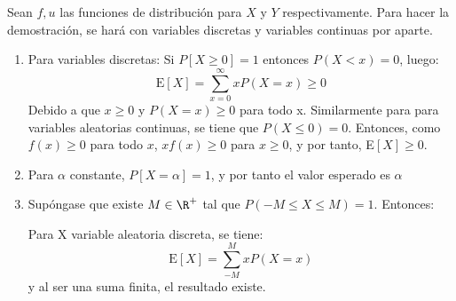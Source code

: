 \begin{Demo} Sean $f,u$ las funciones de distribución para $X$ y $Y$
    respectivamente. Para hacer la demostración, se hará con variables discretas 
    y variables continuas por aparte.

\begin{enumerate}
    \item Para variables discretas:
    Si $P[X \geq 0]=1$ entonces $P(X < x)=0$, luego:
    \[
        \text{E}[X]=\sum_{x=0}^{\infty}xP(X=x) \geq  0
    \]
    Debido a que $x\geq0$ y $P(X=x)\geq 0$ para todo x.
    Similarmente para para variables aleatorias continuas, se tiene
    que $P(X\leq0)=0$. Entonces, como $f(x)\geq0$ para todo $x$,
    $xf(x)\geq0$ para $x\geq0$, y por tanto, E$[X]\geq0$.
    \item Para $\alpha$ constante, $P[X=\alpha]=1$, y por tanto el valor
    esperado es $\alpha$
    \item Supóngase que existe $M\in\R^+$ tal que $P(-M\leq X\leq M)=1$.
    Entonces:
    
    Para X variable aleatoria discreta, se tiene:
    \[
        \text{E}[X]=\sum_{-M}^{M}xP(X=x)
    \]
    y al ser una suma finita, el resultado existe. 
    

\end{enumerate}
\end{Demo}
